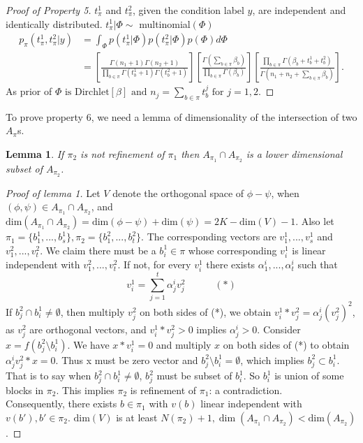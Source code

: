 \documentclass[aoas,preprint]{imsart}
\newtheorem{lemma}{Lemma}
\begin{document}
\begin{proof}[Proof of Property 5]
$t_\pi^1$ and $t_\pi^2$, given the condition label $y$, are independent and identically distributed. $t_\pi^1 |\Phi \sim$ multinomial$(\Phi)$
\begin{align*}
p_\pi(t^1_{\pi},t^2_{\pi}| y) &= \int_\Phi p(t_\pi^1 | \Phi) p(t_\pi^2 | \Phi) p(\Phi) d\Phi \\
&= \left[ \frac{ \Gamma(n_1+1) \Gamma(n_2+1) }{ \prod_{b \in \pi} \Gamma(t^1_b+1) 
   \Gamma( t^2_b + 1 )} \right] 
\left[ \frac{\Gamma( \sum_{b \in \pi} \beta_b  )}{
   \prod_{b \in \pi} \Gamma(\beta_b )} \right] 
 \left[ \frac{ \prod_{b \in \pi} \Gamma( \beta_b + t^1_b + t^2_b )}{
	\Gamma( n_1 + n_2 + \sum_{b \in \pi} \beta_b  )} \right].
\end{align*}
As prior of $\Phi \text{ is Dirchlet}[ \beta ] \text{ and } n_j = \sum_{b \in \pi} t_b^j \text{ for } j = 1,2$.
\end{proof}


To prove property 6, we need a lemma of dimensionality of the intersection of two $A_\pi$s. 
\begin{lemma}
If $\pi_2$ is not refinement of $\pi_1$ then $A_{\pi_1} \cap A_{\pi_2}$ is a lower dimensional subset of $A_{\pi_2}$.
\end{lemma}

\begin{proof}[Proof of lemma 1]
Let $V$ denote the orthogonal space of $\phi - \psi$, when $(\phi,\psi)\in A_{\pi_1} \cap A_{\pi_2}$, and $\text{dim}(A_{\pi_1} \cap A_{\pi_2}) = \text{dim}(\phi - \psi) + \text{dim}(\psi) = 2K - \text{dim}(V) - 1$. Also let $\pi_1 = \{b_1^1,...,b_s^1\}, \pi_2 = \{b_1^2,...,b_t^2\}$. The corresponding vectors are $v_1^1,...,v_s^1$ and $v_1^2,...,v_t^2$. We claim there must be a $b_i^1\in \pi$ whose corresponding $v_i^1$ is linear independent with $v_1^2,...,v_t^2$. If not, for every $v_i^1$ there exists $\alpha_1^i,...,\alpha_t^i$ such that 
\[
v_i^1 = \sum_{j = 1}^t \alpha_j^i v_j^2 \quad\quad\quad(*)
\]
If $b_j^2 \cap b_i^1 \neq \emptyset$, then multiply $v_j^2$ on both sides of (*), we obtain $v_i^1 * v_j^2 = \alpha_j^i (v_j^2)^2$, as $v_j^2$ are orthogonal vectors, and $v_i^1 * v_j^2 > 0$ implies $\alpha_j^i > 0$. Consider $x = f(b_j^2\setminus b_i^1)$. We have $x*v_i^1 = 0$ and multiply $x$ on both sides of (*) to obtain $\alpha_j^i v_j^2*x = 0$. Thus x must be zero vector and $b_j^2\setminus b_i^1= \emptyset$, which implies $b_j^2 \subset b_i^1$. That is to say when $b_j^2 \cap b_i^1 \neq \emptyset$, $b_j^2$ must be subset of $b_i^1$. So $b_i^1$ is union of some blocks in $\pi_2$. This implies $\pi_2$ is refinement of $\pi_1$: a contradiction.\\
Consequently, there exists $b\in\pi_1$ with $v(b)$ linear independent with $v(b'), b'\in\pi_2$. $\text{dim}(V)$ is at least $N(\pi_2) + 1, \dim(A_{\pi_1} \cap A_{\pi_2}) < \text{dim}(A_{\pi_2})$.
\end{proof}
\end{document}
